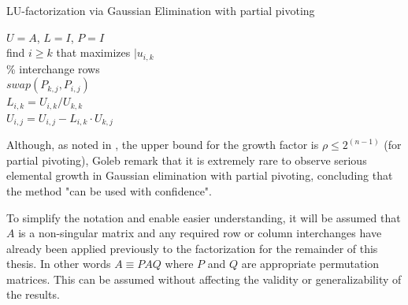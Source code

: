 \begin{algorithm}[h]
  \caption{LU-factorization via Gaussian Elimination with partial pivoting}
  \label{alg:lu_pivoting}
  \SetAlgoLined
  $U=A$, $L=I$, $P=I$ \\
  find $i \geq k $ that maximizes $|u_{i,k}$\\
  \% interchange rows \\ 
   {
    $swap(P_{k,j}, P_{i,j})$\\
    }
   {
     {
      $L_{i, k} = U_{i, k} / U_{k, k}$ \\
       {
        $U_{i, j} = U_{i, j} - L_{i, k} \cdot U_{k,j}$
      }
    }
  }
\end{algorithm}

\noindent Although, as noted in \cite{higham_accuracy_2002}, the upper bound for the growth factor is $\rho \leq 2^(n-1)$ (for partial pivoting), Goleb \cite{golub_matrix_2013} remark that it is extremely rare to observe serious elemental growth in Gaussian elimination with partial pivoting, concluding that the method "can be used with confidence".

To simplify the notation and enable easier understanding, it will be assumed that $A$ is a non-singular matrix and any required row or column interchanges have already been applied previously to the factorization for the remainder of this thesis. In other words $A\equiv PAQ$ where $P$ and $Q$ are appropriate permutation matrices. This can be assumed without affecting the validity or generalizability of the results.